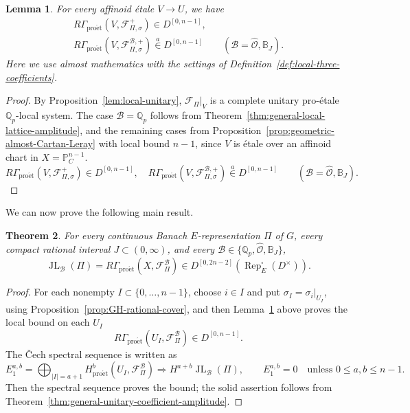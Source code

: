 \documentclass[11pt]{article}
\newtheorem{theorem}{Theorem}[section]
\newtheorem{lemma}[theorem]{Lemma}
\theoremstyle{definition}
\newcommand{\Qp}{\mathbb Q_p}
\newcommand{\cF}{\mathcal F}
\newcommand{\Period}{\mathbb P_C^{n-1}}
\newcommand{\proet}{\mathrm{pro\acute et}}
\newcommand{\JL}{\operatorname{JL}}
\newcommand{\Rep}{\operatorname{Rep}}
\newcommand{\ain}{\mathrel{\overset{a}{\in}}}
\begin{document}
\begin{lemma}%
\label{lem:local-three-coefficient-amplitude}
\label{lem:compact-local-Artin}
\label{lem:arithmetic-local-completed-amplitude}
For every affinoid \'etale \(V\to U\), we have
\begin{equation}\label{eq:local-geometric-almost-amplitude}
 \begin{gathered}
 R\Gamma_{\proet}(V,\cF_{\Pi,\sigma}^+)
 \in D^{[0,n-1]},\\
 R\Gamma_{\proet}(V,\cF_{\Pi,\sigma}^{\mathscr B,+})
 \ain D^{[0,n-1]}
 \qquad
 (\mathscr B=\widehat{\mathscr O},\mathbb B_J).
 \end{gathered}
\end{equation}
Here we use almost mathematics with the settings of
Definition~\ref{def:local-three-coefficients}.
\end{lemma}
\begin{proof}
      By Proposition~\ref{lem:local-unitary}, \(\cF_\Pi|_V\) is a complete
unitary pro-\'etale \(\Qp\)-local system.  The case $\mathscr{B}=\mathbb{Q}_p$ follows from
Theorem~\ref{thm:general-local-lattice-amplitude}, and the remaining cases from Proposition~\ref{prop:geometric-almost-Cartan-Leray}
with local bound \(n-1\), since \(V\) is \'etale over an affinoid
chart in \(X=\Period\).
\begin{equation}%
 R\Gamma_{\proet}(V,\cF_{\Pi,\sigma}^{+})
 \in D^{[0,n-1]},\quad R\Gamma_{\proet}(V,\cF_{\Pi,\sigma}^{\mathscr B,+})
 \ain D^{[0,n-1]}
 \qquad
 (\mathscr B=\widehat{\mathscr O},\mathbb B_J).
\end{equation}
\end{proof}

We can now prove the following main result.

\begin{theorem}%
\label{thm:general-Banach-amplitude}
\label{thm:structural-amplitude}
\label{thm:period-amplitude}
For every continuous Banach \(E\)-representation \(\Pi\) of
\(G\), every compact rational interval \(J\subset(0,\infty)\),
and every \(\mathscr B\in\{\Qp,\widehat{\mathscr O},\mathbb B_J\}\),
\[
 \JL_{\mathscr B}(\Pi)
 =R\Gamma_{\proet}(X,\cF_\Pi^{\mathscr B})
 \in D^{[0,2n-2]}(\Rep_E^\square(D^\times)).
\]
\end{theorem}
\begin{proof}
For each nonempty \(I\subset\{0,\ldots,n-1\}\), choose
\(i\in I\) and put \(\sigma_I=\sigma_i|_{U_I}\), using
Proposition~\ref{prop:GH-rational-cover}, and then
Lemma~\ref{lem:local-three-coefficient-amplitude} above proves the local bound on each $U_I$
\[
 R\Gamma_{\proet}(U_I,\cF_\Pi^{\mathscr B})\in D^{[0,n-1]}.
\]
The \v Cech spectral sequence is written as
\[
 E_1^{a,b}=\bigoplus_{|I|=a+1}
 H^b_{\proet}(U_I,\cF_\Pi^{\mathscr B})
 \Longrightarrow H^{a+b}\JL_{\mathscr B}(\Pi),\qquad
 E_1^{a,b}=0\quad\text{unless }0\leq a,b\leq n-1.
\]
Then the spectral sequence proves the bound; the solid assertion follows from
Theorem~\ref{thm:general-unitary-coefficient-amplitude}.
\end{proof}
\end{document}
